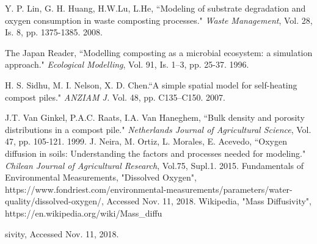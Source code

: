 \documentclass[12pt, letterpaper, titlepage]{article}
\begin{document}
    
\begin{thebibliography}{1}

 Y. P. Lin, G. H. Huang, H.W.Lu, L.He, ``Modeling of substrate degradation and oxygen consumption in waste composting processes." {\em Waste Management}, Vol. 28, Is. 8, pp. 1375-1385. 2008.

  The Japan Reader, ``Modelling composting as a microbial ecosystem: a simulation approach." {\em Ecological Modelling}, Vol. 91, Is. 1–3, pp. 25-37. 1996.

 H. S. Sidhu, M. I. Nelson, X. D. Chen.``A simple spatial model for self-heating compost piles." {\em ANZIAM J.} Vol. 48, pp. C135--C150. 2007.

 J.T. Van Ginkel, P.A.C. Raats, I.A. Van Haneghem, ``Bulk density and porosity distributions in a compost pile." {\em Netherlands Journal of Agricultural Science}, Vol. 47, pp. 105-121. 1999.
 J. Neira, M. Ortiz, L. Morales, E. Acevedo, ``Oxygen diffusion in soils: Understanding the factors and processes needed for modeling." {\em Chilean Journal of Agricultural Research}, Vol.75, Supl.1. 2015.
 Fundamentals of Environmental Measurements, "Dissolved Oxygen", https://www.fondriest.com/environmental-measurements/parameters/water-quality/dissolved-oxygen/, Accessed Nov. 11, 2018.
 Wikipedia, "Mass Diffusivity", https://en.wikipedia.org/wiki/Mass\_diffu

sivity, Accessed Nov. 11, 2018.
\end{thebibliography}
\end{document}

